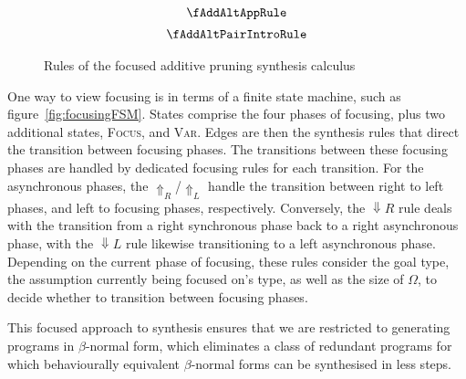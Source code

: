 \begin{figure}[H]
  \begin{align*}
\begin{array}{c}
\fAddAltAppRule
  \\[0.5em]
\fAddAltPairIntroRule
  \end{array}
  \end{align*}
  \caption{Rules of the focused additive pruning synthesis calculus}
  \label{fig:focus-add-pruning}
\end{figure}

One way to view focusing is in terms of a finite state machine, such as
figure~\ref{fig:focusingFSM}. States comprise the four phases of focusing, plus
two additional states, \textsc{Focus}, and \textsc{Var}. Edges are then the
synthesis rules that direct the transition between focusing phases. The
transitions between these focusing phases are handled by dedicated focusing
rules for each transition. For the asynchronous phases, the
$\Uparrow_{R}$/$\Uparrow_{L}$ handle the transition between right to left
phases, and left to focusing phases, respectively. Conversely, the
$\Downarrow{R}$ rule deals with the transition from a right synchronous phase
back to a right asynchronous phase, with the $\Downarrow{L}$ rule likewise
transitioning to a left asynchronous phase. Depending on the current phase of
focusing, these rules consider the goal type, the assumption currently being
focused on's type, as well as the size of $\Omega$, to decide whether to
transition between focusing phases. 

This focused approach to synthesis ensures that we are restricted to generating
programs in $\beta$-normal form, which eliminates a class of redundant programs
for which behaviourally equivalent $\beta$-normal forms can be synthesised in
less steps.

